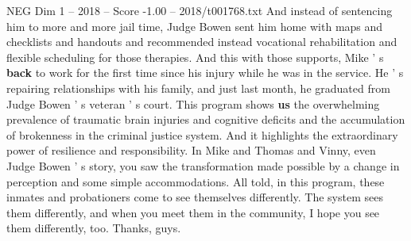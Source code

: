 \begin{textsample}{NEG Dim 1 – 2018 – Score -1.00 – 2018/t001768.txt}
And instead of sentencing him to more and more jail time, Judge Bowen sent him home with maps and checklists and handouts and recommended instead vocational rehabilitation and flexible scheduling for those therapies.
And this with those supports, Mike ' s \textbf{back} to work for the first time since his injury while he was in the service.
He ' s repairing relationships with his family, and just last month, he graduated from Judge Bowen ' s veteran ' s court.
This program shows \textbf{us} the overwhelming prevalence of traumatic brain injuries and cognitive deficits and the accumulation of brokenness in the criminal justice system.
And it highlights the extraordinary power of resilience and responsibility.
In Mike and Thomas and Vinny, even Judge Bowen ' s story, you saw the transformation made possible by a change in perception and some simple accommodations.
All told, in this program, these inmates and probationers come to see themselves differently.
The system sees them differently, and when you meet them in the community, I hope you see them differently, too.
Thanks, guys.

\end{textsample}
